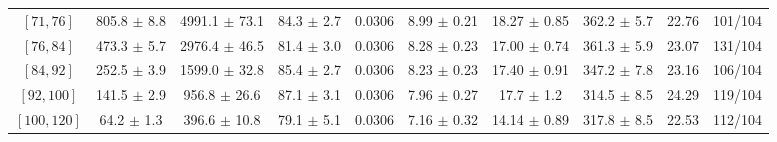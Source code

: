 \begin{tabular}{c||c|c|c|c|c|c|c||c|c}
$[71, 76]$ & 805.8 $\pm$ 8.8 & 4991.1 $\pm$ 73.1 & 84.3 $\pm$ 2.7 & 0.0306 & 8.99 $\pm$ 0.21 & 18.27 $\pm$ 0.85 & 362.2 $\pm$ 5.7 & 22.76 & 101/104\\
$[76, 84]$ & 473.3 $\pm$ 5.7 & 2976.4 $\pm$ 46.5 & 81.4 $\pm$ 3.0 & 0.0306 & 8.28 $\pm$ 0.23 & 17.00 $\pm$ 0.74 & 361.3 $\pm$ 5.9 & 23.07 & 131/104\\
$[84, 92]$ & 252.5 $\pm$ 3.9 & 1599.0 $\pm$ 32.8 & 85.4 $\pm$ 2.7 & 0.0306 & 8.23 $\pm$ 0.23 & 17.40 $\pm$ 0.91 & 347.2 $\pm$ 7.8 & 23.16 & 106/104\\
$[92, 100]$ & 141.5 $\pm$ 2.9 & 956.8 $\pm$ 26.6 & 87.1 $\pm$ 3.1 & 0.0306 & 7.96 $\pm$ 0.27 & 17.7 $\pm$ 1.2 & 314.5 $\pm$ 8.5 & 24.29 & 119/104\\
$[100, 120]$ & 64.2 $\pm$ 1.3 & 396.6 $\pm$ 10.8 & 79.1 $\pm$ 5.1 & 0.0306 & 7.16 $\pm$ 0.32 & 14.14 $\pm$ 0.89 & 317.8 $\pm$ 8.5 & 22.53 & 112/104\\
\end{tabular}

